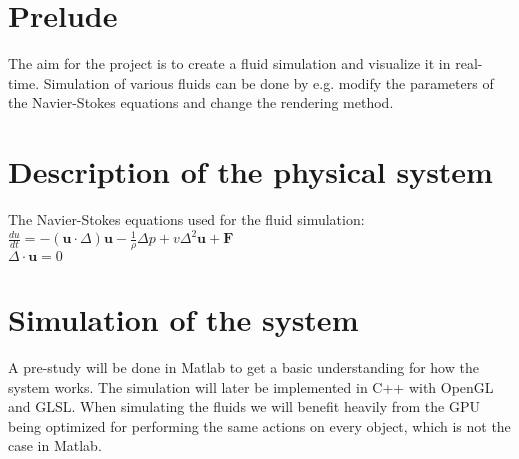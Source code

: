 \documentclass[a4paper,12pt,twoside,swedish]{report}
\begin{document}
\pagestyle{plain}

\setcounter{page}{1}


\section{Prelude}
The aim for the project is to create a fluid simulation and visualize it in real-time. Simulation of various fluids can be done by e.g. modify the parameters of the Navier-Stokes equations and change the rendering method.

\section{Description of the physical system}
The Navier-Stokes equations used for the fluid simulation:\\
\(\frac{du}{dt} = - (\textbf{u}\cdot{\Delta})\textbf{u} - \frac{1}{\rho}\Delta p + v \Delta^2 \textbf{u} + \textbf{F}\) \\
\(\Delta \cdot \textbf{u} = 0 \)

\section{Simulation of the system}
A pre-study will be done in Matlab to get a basic understanding for how the system works. The simulation will later be implemented in C++ with OpenGL and GLSL. When simulating the fluids we will benefit heavily from the GPU being optimized for performing the same actions on every object, which is not the case in Matlab.
\end{document}
